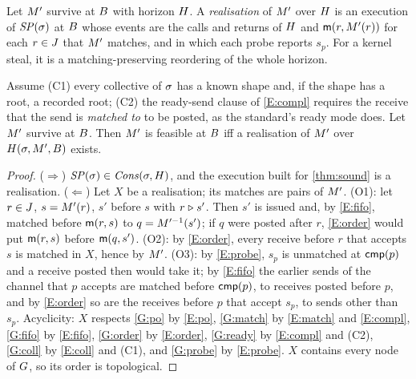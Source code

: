 \begin{definition}\label{def:app-real}
Let $M'$ survive at $B$ with horizon $H$. A \emph{realisation} of $M'$ over $H$
is an execution of $\mathit{SP}(\sigma)$ at $B$ whose events are the calls and returns of $H$ and
$\mathsf{m}(r,M'(r))$ for each $r\in J$ that $M'$ matches, and in which each probe
reports $s_p$. For a kernel steal, it is a matching-preserving reordering of the whole horizon.
\end{definition}

\begin{theorem}\label{thm:app-complete}
Assume (C1) every collective of $\sigma$ has a known shape and, if the shape has a root, a
recorded root; (C2) the ready-send clause of \ref{E:compl} requires the receive that the send is
\emph{matched to} to be posted, as the standard's ready mode does. Let $M'$ survive at $B$.
Then $M'$ is feasible at $B$ iff a realisation of $M'$ over $H(\sigma,M',B)$
exists.
\end{theorem}

\begin{proof}
($\Rightarrow$) $\mathit{SP}(\sigma)\in\mathit{Cons}(\sigma,H)$, and the execution built for
\cref{thm:sound} is a realisation. ($\Leftarrow$) Let $X$ be a realisation; its matches are
pairs of $M'$. (O1): let $r\in J$, $s=M'(r)$, $s'$ before $s$ with $r\mathrel{\triangleright} s'$.
Then $s'$ is issued and, by \ref{E:fifo}, matched before $\mathsf{m}(r,s)$ to $q=M'^{-1}(s')$; if
$q$ were posted after $r$, \ref{E:order} would put $\mathsf{m}(r,s)$ before $\mathsf{m}(q,s')$. (O2): by
\ref{E:order}, every receive before $r$ that accepts $s$ is matched in $X$, hence by $M'$.
(O3): by \ref{E:probe}, $s_p$ is unmatched at $\mathsf{cmp}(p)$ and a receive posted then would take
it; by \ref{E:fifo} the earlier sends of the channel that $p$ accepts are matched before
$\mathsf{cmp}(p)$, to receives posted before $p$, and by \ref{E:order} so are the receives before $p$
that accept $s_p$, to sends other than $s_p$. Acyclicity: $X$ respects \ref{G:po} by
\ref{E:po}, \ref{G:match} by \ref{E:match} and \ref{E:compl}, \ref{G:fifo} by \ref{E:fifo},
\ref{G:order} by \ref{E:order}, \ref{G:ready} by \ref{E:compl} and (C2), \ref{G:coll} by
\ref{E:coll} and (C1), and \ref{G:probe} by \ref{E:probe}. $X$ contains every node of $G$,
so its order is topological.
\end{proof}

